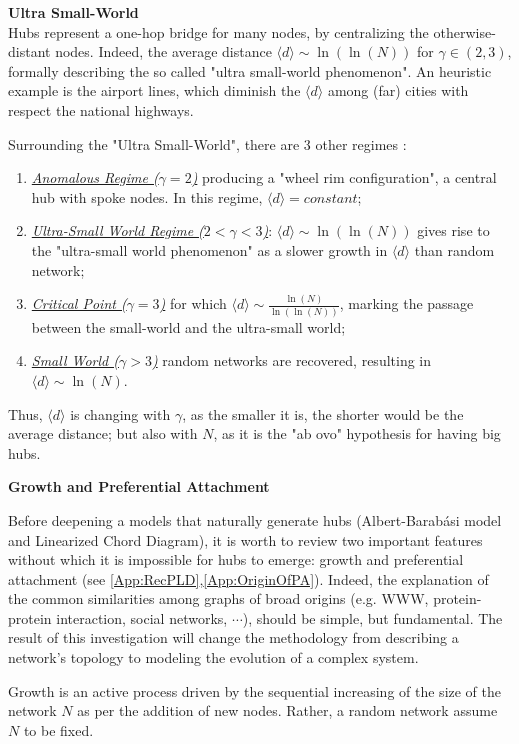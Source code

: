 \documentclass[a4paper,12pt,twoside]{book} %
\theoremstyle{definition}
\begin{document}
{\large \textbf{Ultra Small-World}} \\
Hubs represent a one-hop bridge for many nodes, by centralizing the otherwise-distant nodes. Indeed, the average distance $\langle d \rangle \sim \ln(\ln(N))$ for $\gamma \in (2,3)$, formally describing the so called "ultra small-world phenomenon". An heuristic example is the airport lines, which diminish the \(\langle d \rangle\) among (far) cities with respect the national highways.

Surrounding the "Ultra Small-World", there are $3$ other regimes
\cite{Cohen:2003_SFUSW}:
\begin{enumerate}
	\item \underline{\textit{Anomalous Regime ($\gamma = 2$)}} producing a "wheel rim configuration", 
	a central hub with spoke nodes. In this regime, $\langle d \rangle = constant$;
	\item \underline{\textit{Ultra-Small World Regime ($2 < \gamma < 3$)}}: $\langle d \rangle \sim \ln(\ln(N))$ gives rise to the "ultra-small world phenomenon" as a slower growth in $\langle d \rangle$ than random network;
	\item \underline{\textit{Critical Point ($\gamma = 3$)}} for which $\langle d \rangle \sim \frac{\ln(N)}{\ln(\ln(N))}$, marking the passage between the small-world and the ultra-small world;
	\item \underline{\textit{Small World ($\gamma > 3$)}} random networks are recovered, resulting in $\langle d \rangle \sim \ln(N)$.
\end{enumerate}
Thus, \(\langle d \rangle\) is changing with $\gamma$, as the smaller it is, the shorter would be the average distance; but also with $N$, as it is the "ab ovo" hypothesis for having big hubs.

{\large \textbf{Growth and Preferential Attachment}} 

Before deepening a models that naturally generate hubs (Albert-Barabási model and Linearized Chord Diagram), it is worth to review two important features without which it is impossible for hubs to emerge: growth and preferential attachment (see \autoref{App:RecPLD},\autoref{App:OriginOfPA}). Indeed, the explanation of the common similarities among graphs of broad origins (e.g. WWW, protein-protein interaction, social networks, $\cdots$), should be simple, but fundamental. The result of this investigation will change the methodology from describing a network’s topology to modeling the evolution of a complex system.

Growth is an active process driven by the sequential increasing of the size of the network $N$ as per the addition of new nodes. Rather, a random network assume $N$ to be fixed. 
\end{document}
